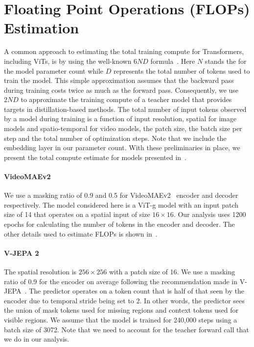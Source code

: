 \documentclass{applemlr}
\numberwithin{equation}{section}
\begin{document}
\section{Floating Point Operations (FLOPs) Estimation}
\label{appendix:sec:flops_estimation}

A common approach to estimating the total training compute for Transformers, including ViTs, is by using the well-known $6ND$ formula~\citep{brownscaling2020, hoffmann2022training}. Here $N$ stands the for the model parameter count while $D$ represents the total number of tokens used to train the model. This simple approximation assumes that the backward pass during training costs twice as much as the forward pass. Consequently, we use $2ND$ to approximate the training compute of a teacher model that provides targets in distillation-based methods. The total number of input tokens observed by a model during training is a function of input resolution, spatial for image models and spatio-temporal for video models, the patch size, the batch size per step and the total number of optimization steps. Note that we include the embedding layer in our parameter count. With these preliminaries in place, we present the total compute estimate for models presented in~.   

\paragraph{VideoMAEv2~\citep{videomaev2_wang2023_cvpr}} We use a masking ratio of 0.9 and 0.5 for VideoMAEv2~\citep{videomaev2_wang2023_cvpr} encoder and decoder respectively. The model considered here is a ViT-g model with an input patch size of 14 that operates on a spatial input of size $16 \times 16$. Our analysis uses 1200 epochs for calculating the number of tokens in the encoder and decoder. The other details used to estimate FLOPs is shown in~. 

\paragraph{V-JEPA 2~\citep{assran2025vjepa2}} The spatial resolution is $256 \times 256$ with a patch size of 16. We use a masking ratio of 0.9 for the encoder on average following the recommendation made in V-JEPA~\citep{bardes2024vjepa}. The predictor operates on a token count that is half of that seen by the encoder due to temporal stride being set to 2. In other words, the predictor sees the union of mask tokens used for missing regions and context tokens used for visible regions. We assume that the model is trained for 240,000 steps using a batch size of 3072. Note that we need to account for the teacher forward call that we do in our analysis.
\end{document}
